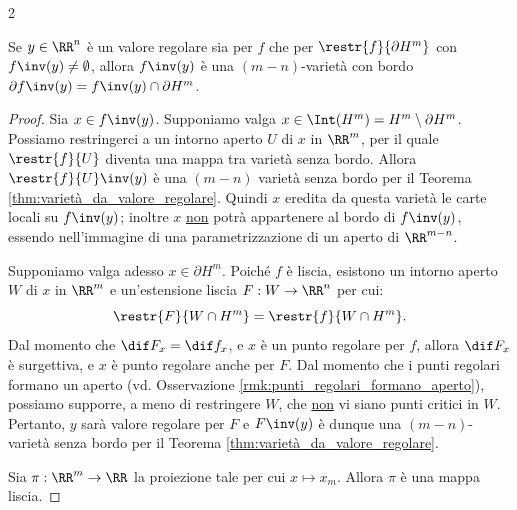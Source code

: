 \begin{multicols*}{2}
\begin{lemma}
        Se $y \in \RR^n$ è un valore regolare
        sia per $f$ che per $\restr{f}{\partial H^m}$ con $f\inv(y) \neq \emptyset$, allora $f\inv(y)$ è una $(m-n)$-varietà con bordo
        $\partial f\inv(y) = f\inv(y) \cap \partial H^m$.
    \end{lemma}

    \begin{proof}
        Sia $x \in f\inv(y)$. Supponiamo valga $x \in \Int(H^m) = H^m \setminus \partial H^m$. Possiamo
        restringerci a un intorno aperto $U$ di $x$ in $\RR^m$, per il quale $\restr{f}{U}$ diventa una mappa tra
        varietà senza bordo. Allora $\restr{f}{U}\inv(y)$ è una $(m-n)$ varietà senza bordo per il
        Teorema \ref{thm:varietà_da_valore_regolare}. Quindi $x$ eredita da questa varietà le carte locali su $f\inv(y)$;
        inoltre $x$ \underline{non} potrà appartenere al bordo di $f\inv(y)$, essendo nell'immagine di una parametrizzazione
        di un aperto di $\RR^{m-n}$. \smallskip

        Supponiamo valga adesso $x \in \partial H^m$. Poiché $f$ è liscia, esistono un intorno aperto $W$
        di $x$ in $\RR^m$ e un'estensione liscia $F : W \to \RR^n$ per cui:
        \[
            \restr{F}{W \cap H^m} = \restr{f}{W \cap H^m}.
        \]
        Dal momento che $\dif F_x = \dif f_x$, e $x$ è un punto regolare per $f$, allora $\dif F_x$ è surgettiva,
        e $x$ è punto regolare anche per $F$. Dal momento che i punti regolari formano un aperto (vd. Osservazione
        \ref{rmk:punti_regolari_formano_aperto}), possiamo supporre, a meno di restringere $W$, che \underline{non}
        vi siano punti critici in $W$. Pertanto, $y$ sarà valore regolare per $F$ e $F\inv(y)$ è dunque una $(m-n)$-varietà
        senza bordo per il Teorema \ref{thm:varietà_da_valore_regolare}. \smallskip

        Sia $\pi : \RR^m \to \RR$ la proiezione tale per cui $x \mapsto x_m$. Allora $\pi$ è una mappa liscia. \smallskip


\end{proof}
\end{multicols*}
